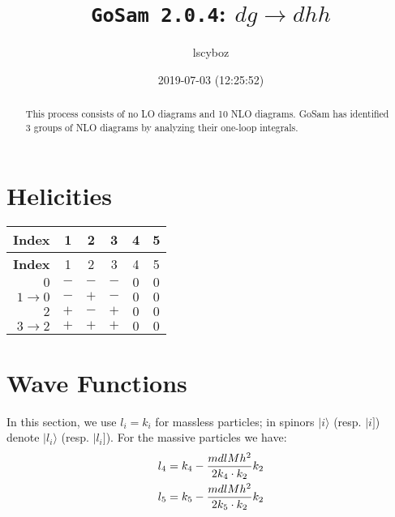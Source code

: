 \documentclass[a4paper]{article}
\title{\texttt{GoSam 2.0.4}: ${d}{g}\rightarrow{d}{h}{h}$}
\author{lscyboz}
\date{2019-07-03 (12:25:52)}
\newcommand{\kea}[1]{\vert #1 \rangle}
\newcommand{\keb}[1]{\vert #1 ]}
\begin{document}
\maketitle
\begin{abstract}
\noindent This process consists of no LO diagrams and 10 NLO diagrams. GoSam has identified 3 groups  of NLO diagrams by analyzing their one-loop integrals.
\end{abstract}
\newpage
\tableofcontents
\newpage

\section{Helicities}

\begin{longtable}[c]{r|ccccc}
\bf{Index} &1&2&3&4&5\\
\hline
\endfirsthead
\bf{Index} &1&2&3&4&5\\
\hline
\endhead 
$0$& $-$& $-$& $-$& $0$& $0$\\
$1\rightarrow 0$& $-$& $+$& $-$& $0$& $0$\\
$2$& $+$& $-$& $+$& $0$& $0$\\
$3\rightarrow 2$& $+$& $+$& $+$& $0$& $0$\\
\end{longtable}
\section{Wave Functions}
In this section, we use $l_i=k_i$ for massless particles;
in spinors $\kea{i}$ (resp. $\keb{i}$) denote $\kea{l_i}$ (resp. $\keb{l_i}$).
For the massive particles we have:
\begin{align}
l_{4} &= k_{4} - \frac{mdlMh^2}{%
      2 k_{4}\cdot k_{2}}k_{2}\\
l_{5} &= k_{5} - \frac{mdlMh^2}{%
      2 k_{5}\cdot k_{2}}k_{2}
\end{align}
\end{document}
